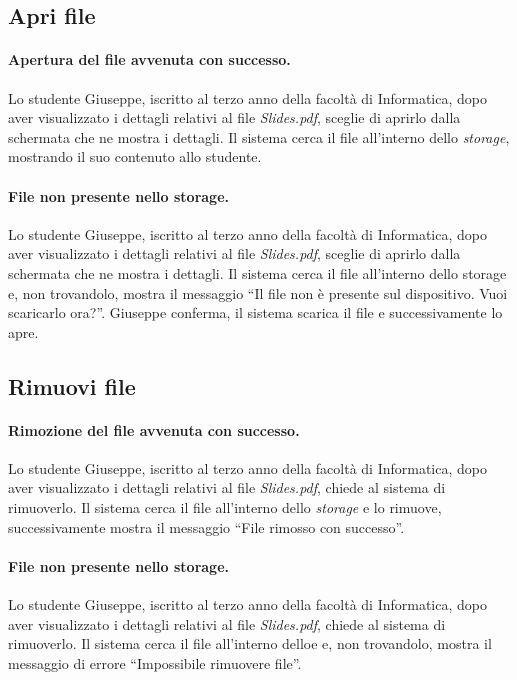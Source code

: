 \subsection{ Apri file}
\paragraph{Apertura del file avvenuta con successo.}
Lo studente Giuseppe, iscritto al terzo anno della facoltà di Informatica, dopo aver visualizzato i dettagli relativi al file \textit{Slides.pdf}, sceglie di aprirlo dalla schermata che ne mostra i dettagli. Il sistema cerca il file all'interno dello \textit{storage}, mostrando il suo contenuto allo studente.

\paragraph{File non presente nello \textbf{storage}.}
Lo studente Giuseppe, iscritto al terzo anno della facoltà di Informatica, dopo aver visualizzato i dettagli relativi al file \textit{Slides.pdf}, sceglie di aprirlo dalla schermata che ne mostra i dettagli. Il sistema cerca il file all'interno dello storage e, non trovandolo, mostra il messaggio “Il file non è presente sul dispositivo. Vuoi scaricarlo ora?”. Giuseppe conferma, il sistema scarica il file e successivamente lo apre.

\subsection{Rimuovi file}
\paragraph{Rimozione del file avvenuta con successo.}
Lo studente Giuseppe, iscritto al terzo anno della facoltà di Informatica, dopo aver visualizzato i dettagli relativi al file \textit{Slides.pdf}, chiede al sistema di rimuoverlo. Il sistema cerca il file all'interno dello \textit{storage} e lo rimuove, successivamente mostra il messaggio “File rimosso con successo”.
	
\paragraph{File non presente nello \textbf{storage}.}
Lo studente Giuseppe, iscritto al terzo anno della facoltà di Informatica, dopo aver visualizzato i dettagli relativi al file \textit{Slides.pdf}, chiede al sistema di rimuoverlo. Il sistema cerca il file all'interno delloe e, non trovandolo, mostra il messaggio di errore “Impossibile rimuovere file”.



